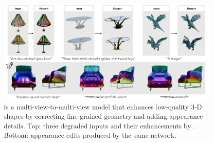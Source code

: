 \begin{figure}[H]                   %
  \centering
  \includegraphics[width=.90\textwidth]{images/sharpe_teaser_new.pdf}
  \caption{\ourname{} is a multi-view-to-multi-view model that enhances
  low-quality 3-D shapes by correcting fine-grained geometry and adding
  appearance details.  Top: three degraded inputs and their enhancements by
  \ourname.  Bottom: appearance edits produced by the same network.}  \label{fig:teaser}
\end{figure}
